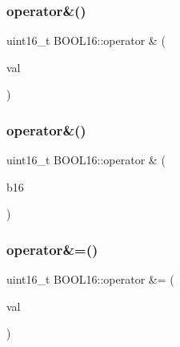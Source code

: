 \subsubsection{\texorpdfstring{operator\&()}{operator\&()}\hspace{0.1cm}{\footnotesize\ttfamily [1/2]}}
{\footnotesize\ttfamily uint16\+\_\+t B\+O\+O\+L16\+::operator \& (\begin{DoxyParamCaption}\item[{const uint16\+\_\+t}]{val }\end{DoxyParamCaption})\hspace{0.3cm}{\ttfamily [inline]}}

\hypertarget{struct_b_o_o_l16_a06e9d0d0af8d087316055c5a1e46c7f1}{}\label{struct_b_o_o_l16_a06e9d0d0af8d087316055c5a1e46c7f1} 
\subsubsection{\texorpdfstring{operator\&()}{operator\&()}\hspace{0.1cm}{\footnotesize\ttfamily [2/2]}}
{\footnotesize\ttfamily uint16\+\_\+t B\+O\+O\+L16\+::operator \& (\begin{DoxyParamCaption}\item[{const \hyperlink{struct_b_o_o_l16}{B\+O\+O\+L16}}]{b16 }\end{DoxyParamCaption})\hspace{0.3cm}{\ttfamily [inline]}}

\hypertarget{struct_b_o_o_l16_aea3642667465bbc7f98cbc8317dd245c}{}\label{struct_b_o_o_l16_aea3642667465bbc7f98cbc8317dd245c} 
\subsubsection{\texorpdfstring{operator\&=()}{operator\&=()}\hspace{0.1cm}{\footnotesize\ttfamily [1/2]}}
{\footnotesize\ttfamily uint16\+\_\+t B\+O\+O\+L16\+::operator \&= (\begin{DoxyParamCaption}\item[{const uint16\+\_\+t}]{val }\end{DoxyParamCaption})\hspace{0.3cm}{\ttfamily [inline]}}

\hypertarget{struct_b_o_o_l16_a7f993957f3bc3effad1a4bf4e63d5b0a}{}\label{struct_b_o_o_l16_a7f993957f3bc3effad1a4bf4e63d5b0a} 
